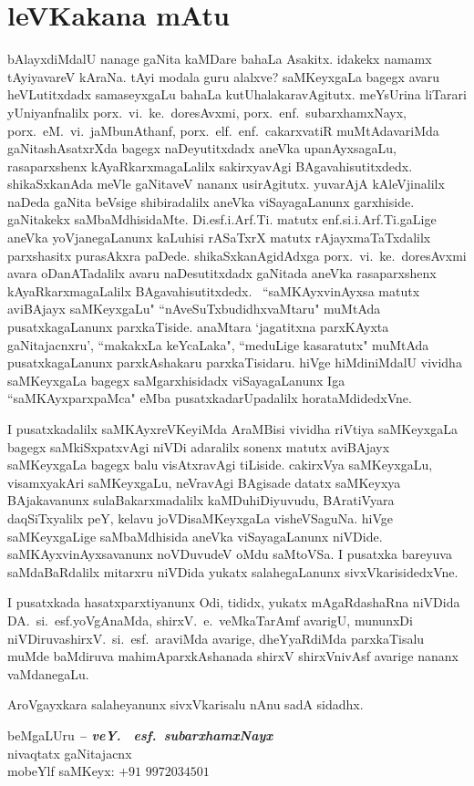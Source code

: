 \chapter*{leVKakana mAtu}
\vskip -25pt

bAlayxdiMdalU nanage gaNita kaMDare bahaLa Asakitx. idakekx namamx tAyiyavareV kAraNa. tAyi modala 
guru alalxve? saMKeyxgaLa bagegx avaru heVLutitxdadx samaseyxgaLu bahaLa kutUhalakaravAgitutx. 
meYsUrina liTarari yUniyanfnalilx porx.\ vi.~ke.\ doresAvxmi, porx.\ enf.\ subarxhamxNayx, 
porx.\ eM.\ vi.\ jaMbunAthanf, porx.\ elf.~enf.~cakarxvatiR muMtAdavariMda gaNitashAsatxrXda bagegx    naDeyutitxdadx aneVka upanAyxsagaLu, rasaparxshenx kAyaR\-karxmagaLalilx sakirxyavAgi BAgavahisutitxdedx. shikaSxkanAda meVle gaNitaveV nananx usirAgitutx. yuvarAjA kAleVjinalilx naDeda gaNita beVsige shibiradalilx aneVka viSayagaLanunx garxhiside. gaNitakekx saMbaMdhisidaMte. Di.esf.i.Arf.Ti. matutx enf.si.i.Arf.Ti.gaLige aneVka yoVjanegaLanunx kaLuhisi rASaTxrX matutx rAjayx\-maTaTxdalilx parxshasitx purasAkxra paDede. shikaSxkanAgidAdxga porx.~vi.~ke.\ doresAvxmi avara oDanATadalilx avaru naDesutitxdadx gaNitada aneVka rasaparxshenx kAyaRkarxmagaLalilx BAgavahisutitxdedx. ~``saMKAyxvinAyxsa matutx aviBAjayx saMKeyxgaLu" ``nAveSuTx\-budidhxvaMtaru" muMtAda pusatxkagaLanunx parxkaTiside. anaMtara `jagatitxna parxKAyxta gaNitajacnxru', ``makakxLa keYcaLaka", ``meduLige kasaratutx" muMtAda pusatxkagaLanunx parxkAshakaru parxkaTisidaru. hiVge hiMdiniMdalU vividha saMKeyxgaLa bagegx saMgarxhisidadx viSayagaLanunx Iga ``saMKAyxparxpaMca" eMba pusatxkadarUpadalilx horataMdidedxVne. 

I pusatxkadalilx saMKAyxreVKeyiMda AraMBisi vividha riVtiya saMKeyxgaLa bagegx saMkiSxpatxvAgi niVDi adaralilx sonenx matutx aviBAjayx saMKeyxgaLa bagegx balu visAtxravAgi tiLiside. cakirxVya saMKeyxgaLu, visamxyakAri saMKeyxgaLu, neVravAgi BAgisade datatx saMKeyxya BAjakavanunx sulaBakarxmadalilx kaMDuhiDiyuvudu, BAratiVyara daqSiTxyalilx peY, kelavu joVDisaMKeyxgaLa visheVSaguNa. hiVge saMKeyxgaLige saMbaMdhisida aneVka viSayagaLanunx niVDide. saMKAyxvinAyxsavanunx noVDuvudeV oMdu saMtoVSa. I pusatxka bareyuva saMdaBaRdalilx mitarxru niVDida yukatx salahegaLanunx sivxVkarisidedxVne.

I pusatxkada hasatxparxtiyanunx Odi, tididx, yukatx mAgaRdashaRna niVDida DA.~si.~esf.\break yoVgAnaMda, shirxV.~e.~veMkaTarAmf avarigU, mununxDi niVDiruva\break shirxV.~si.~esf.~araviMda avarige, dheYyaRdiMda parxkaTisalu muMde baMdiruva mahimA\break parxkAshanada shirxV shirxVnivAsf avarige nananx vaMdanegaLu.

AroVgayxkara salaheyanunx sivxVkarisalu nAnu sadA sidadhx.

\medskip

\begin{flushright}
beMgaLUru \hfill {\sl\bfseries {\rm --} veY. ~esf.\ subarxhamxNayx}\hfill\\
nivaqtatx gaNitajacnx\\
mobeYlf saMKeyx: $+91$ $9972034501$
\end{flushright}

